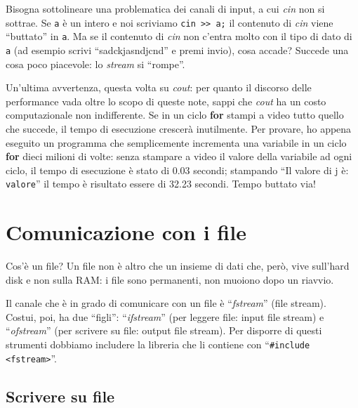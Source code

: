 Bisogna sottolineare una problematica dei canali di input, a cui \emph{cin} non si sottrae. Se \verb|a| è un intero e noi scriviamo \lstinline|cin >> a;| il contenuto di \emph{cin} viene ``buttato'' in \verb|a|. Ma se il contenuto di \emph{cin} non c'entra molto con il tipo di dato di \verb|a| (ad esempio scrivi ``sadckjasndjcnd'' e premi invio), cosa accade? Succede una cosa poco piacevole: lo \emph{stream} si ``rompe''. %


Un'ultima avvertenza, questa volta su \emph{cout}: per quanto il discorso delle performance vada oltre lo scopo di queste note, sappi che \emph{cout} ha un costo computazionale non indifferente. Se in un ciclo \textbf{for} stampi a video tutto quello che succede, il tempo di esecuzione crescerà inutilmente. Per provare, ho appena eseguito un programma che semplicemente incrementa una variabile in un ciclo \textbf{for} dieci milioni di volte: senza stampare a video il valore della variabile ad ogni ciclo, il tempo di esecuzione è stato di 0.03 secondi; stampando ``Il valore di j è: \verb|valore|'' il tempo è risultato essere di 32.23 secondi. Tempo buttato via!

\section{Comunicazione con i file}\label{file}
Cos'è un file? Un file non è altro che un insieme di dati che, però, vive sull'hard disk e non sulla RAM: i file sono permanenti, non muoiono dopo un riavvio. 

Il canale che è in grado di comunicare con un file è ``\emph{fstream}'' (file stream). Costui, poi, ha due ``figli'': ``\emph{ifstream}'' (per leggere file: input file stream) e ``\emph{ofstream}'' (per scrivere su file: output file stream). Per disporre di questi strumenti dobbiamo includere la libreria che li contiene con ``\lstinline|#include <fstream>|''.

\subsection{Scrivere su file}

